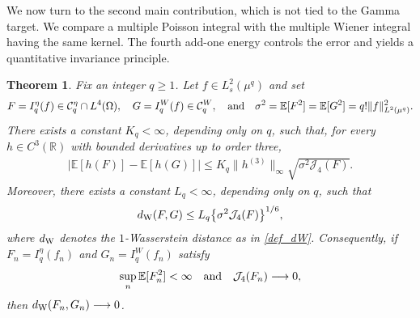 \documentclass[letterpaper,11pt,reqno]{amsart}
\numberwithin{equation}{section}
\theoremstyle{plain}
\newtheorem{theorem}{Theorem}[section]
\theoremstyle{definition}
\theoremstyle{remark}
\newcommand{\E}{\mathbb{E}}
\newcommand{\R}{\mathbb{R}}
\newcommand{\cC}{\mathcal{C}}
\newcommand{\noi}{\noindent}
\newcommand{\Jfour}{\mathcal J_4}
\newcommand{\dW}{d_{\rm W}}
\newcommand{\AND}{\quad{\rm and}\quad}
\begin{document}
\medskip

We now turn to the second main contribution, which is not tied to the
Gamma target.  We compare a multiple Poisson integral with the
multiple Wiener integral having the same kernel.  The fourth add-one
energy controls the error and yields a quantitative invariance
principle.

\begin{theorem}
\label{thm4}
Fix an integer $q\geq1$.  Let $f\in L_s^2(\mu^q)$ and set
\noi
\begin{align*}
 F=I_q^\eta(f)\in\cC_q^\eta\cap L^4(\Omega),
 \quad
 G=I_q^W(f)\in\cC_q^W,
 \AND
 \sigma^2=\E[F^2]=\E[G^2]
 =q!\|f\|_{L^2(\mu^q)}^2.
\end{align*}
There exists a constant $K_q<\infty$, depending only on $q$, such
that, for every $h\in C^3(\R)$ with bounded derivatives up to order
three,
\noi
\begin{align}
 \left|\E[h(F)]-\E[h(G)]\right|
 \leq
 K_q\|h^{(3)}\|_\infty
 \sqrt{\sigma^2\Jfour(F)}.
 \label{thm5_1}
\end{align}
Moreover, there exists a constant $L_q<\infty$, depending only on
$q$, such that
\noi
\begin{align}
 \dW(F,G)
 \leq
 L_q\bigl\{\sigma^2\Jfour(F)\bigr\}^{1/6},
 \label{thm5_2}
\end{align}
where $\dW$ denotes the $1$-Wasserstein distance as in \eqref{def_dW}.
Consequently, if $F_n=I_q^\eta(f_n)$
and
 $G_n=I_q^W(f_n)$
satisfy
\noi
\begin{align} 
 \sup_n\E[F_n^2]<\infty
 \AND
 \Jfour(F_n)\longrightarrow0,
  \notag%
\end{align}
then $\dW(F_n,G_n)\longrightarrow0$.

\end{theorem}
\end{document}
